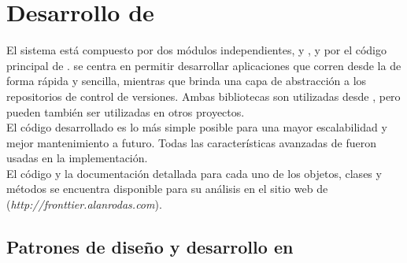 \setcounter{figure}{0}
\renewcommand{\figurename}{UML}

\section{Desarrollo de \fronttier}

El sistema está compuesto por dos módulos independientes, \scaliapp y 
\scalavcs, y por el código principal de \fronttier. \scaliapp se centra en 
permitir desarrollar aplicaciones que corren desde la \cli de forma rápida y 
sencilla, mientras que \scalavcs brinda una capa de abstracción a los 
repositorios de control de versiones. Ambas bibliotecas son utilizadas desde 
\fronttier, pero pueden también ser utilizadas en otros proyectos.\\
El código desarrollado es lo más simple posible para una mayor escalabilidad y 
mejor mantenimiento a futuro. Todas las características avanzadas de \scala 
fueron usadas en la implementación.\\
El código y la documentación detallada para cada uno de los objetos, clases y 
métodos se encuentra disponible para su análisis en el sitio web de \fronttier 
(\emph{http://fronttier.alanrodas.com}).

\subsection{Patrones de diseño y desarrollo en \scala}

